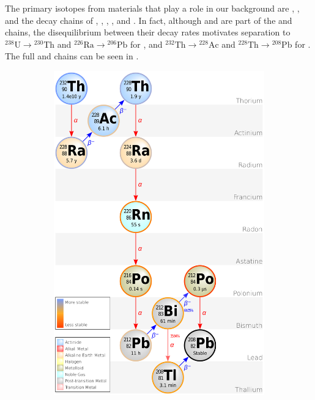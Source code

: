 The primary isotopes from materials that play a role in our background are , , and the decay chains of
, , , , and .  In fact, although  and  are part
of the  and  chains, the disequilibrium between their decay rates motivates separation to
$\mathrm{^{238}U} \rightarrow \mathrm{^{230}Th}$ and $\mathrm{^{226}Ra} \rightarrow \mathrm{^{206}Pb}$ for , and
$\mathrm{^{232}Th} \rightarrow \mathrm{^{228}Ac}$ and $\mathrm{^{228}Th} \rightarrow \mathrm{^{208}Pb}$ for .  The full
 and  chains can be seen in .

\begin{figure}
    \centering
    \begin{subfigure}[t]{0.5\textwidth}
        \centering
        \includegraphics[width=\textwidth]{Decay_Chain_of_Thorium-232}

\end{subfigure}
\end{figure}
